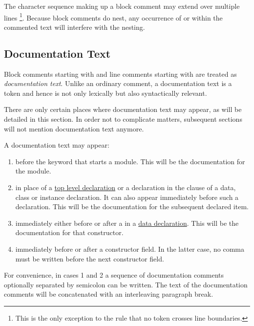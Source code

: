 The character sequence making up a block comment may extend over multiple lines
\footnote{This is the only exception to the rule that no token crosses line
boundaries.}. 
Because block comments do nest, any occurrence of  \regex{-\}} or \regex{\{-} within the
commented text will interfere with the nesting.


\subsection{Documentation Text} \label{doccomment} 

Block comments starting with \regex{\{--} and line comments starting with  \regex{---} are treated as \textit{documentation text}.
Unlike an ordinary comment, a documentation text is a token and hence is not only lexically but also syntactically relevant.

There are only certain places where documentation text may appear, as will be detailed in this section. 
In order not to complicate matters, subsequent sections will not mention documentation text anymore.

A documentation text may appear:
\begin{enumerate}
\item before the  keyword that starts a module. This will be the documentation for the module.
\item in place of a \hyperref[declarations]{top level declaration} or a declaration in the  clause of a data, class or instance declaration. It can also appear immediately before such a declaration.
This will be the documentation for the subsequent declared item. 
\item immediately either before or after a  in a \hyperref[algdcl]{data declaration}. This will be the documentation for that constructor.
\item immediately before or after a constructor field. In the latter case, no comma must be written before the next constructor field. 
\end{enumerate}

For convenience, in cases 1 and 2 a sequence of documentation comments optionally separated by semicolon can be written.
The text of the documentation comments will be concatenated with an interleaving paragraph break.


